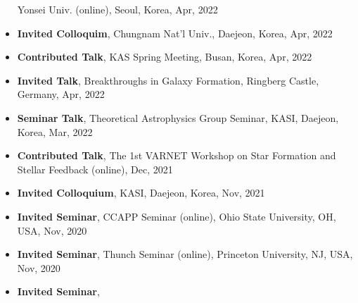 \documentclass[11pt,letterpaper,roman]{moderncv}        %
\begin{document}
\begin{itemize}
  Yonsei Univ. (online), Seoul, Korea, Apr, 2022 %
\item \textbf{Invited Colloquim},
  Chungnam Nat'l Univ., Daejeon, Korea, Apr, 2022 %
\item \textbf{Contributed Talk},
  KAS Spring Meeting, Busan, Korea, Apr, 2022 %
\item \textbf{Invited Talk},
  Breakthroughs in Galaxy Formation, Ringberg Castle, Germany, Apr, 2022 %
\item \textbf{Seminar Talk},
  Theoretical Astrophysics Group Seminar, KASI, Daejeon, Korea, Mar, 2022 %
\item \textbf{Contributed Talk},
  The 1st VARNET Workshop on Star Formation and Stellar Feedback (online), Dec, 2021 %
\item \textbf{Invited Colloquium},
  KASI, Daejeon, Korea, Nov, 2021 %
\item \textbf{Invited Seminar},
  CCAPP Seminar (online), Ohio State University, OH, USA, Nov, 2020 %
\item \textbf{Invited Seminar},
  Thunch Seminar (online), Princeton University, NJ, USA, Nov, 2020 %
\item \textbf{Invited Seminar},

\end{itemize}
\end{document}
